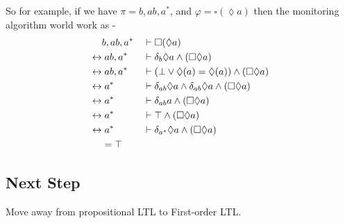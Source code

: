 \documentclass[11pt]{article}
\newcommand{\derivative}[2]{\delta_{#1} #2}
\begin{document}
So for example, if we have $\pi = b , a b , a^*$, and $\varphi = \square (\lozenge a ) $
then the monitoring algorithm world work as -
\begin{align*}
  &\null b, a b , a^*              &\null \vdash \; &\null \square (\lozenge a ) \\
  \leftrightarrow &\null \; a b, a^* &\null \vdash \; &\null \derivative{b}{\lozenge a} \wedge (\square \lozenge a)  \\
  \leftrightarrow &\null \; a b, a^* &\null \vdash \; &\null (\bot \vee
  \lozenge(a) = \lozenge(a))  \wedge (\square \lozenge a)  \\
  \leftrightarrow &\null \;  a^* &\null \vdash \; &\null \derivative{a b }{\lozenge a} \wedge \derivative{a b}{\lozenge a} \wedge  (\square \lozenge a)  \\
  \leftrightarrow &\null \;  a^* &\null \vdash \; &\null \derivative{a b }{a}  \wedge  (\square \lozenge a)  \\
  \leftrightarrow &\null \;  a^* &\null \vdash \; &\null \top  \wedge  (\square \lozenge a)  \\
  \leftrightarrow &\null \; a^* &\null \vdash \; &\null \derivative{a^*}{\lozenge a} \wedge
   (\square \lozenge a) \\
  &\null = \top
\end{align*}

\subsection{Next Step}
Move away from propositional LTL to First-order LTL.
\end{document}
